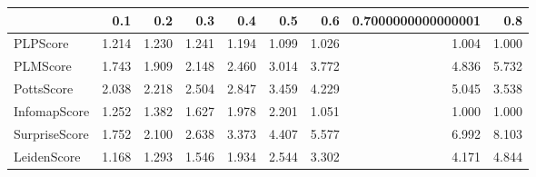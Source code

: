 \begin{tabular}{lrrrrrrrr}
\toprule
{} &   0.1 &   0.2 &   0.3 &   0.4 &   0.5 &   0.6 & 0.7000000000000001 &   0.8 \\
\midrule
PLPScore      & 1.214 & 1.230 & 1.241 & 1.194 & 1.099 & 1.026 &              1.004 & 1.000 \\
PLMScore      & 1.743 & 1.909 & 2.148 & 2.460 & 3.014 & 3.772 &              4.836 & 5.732 \\
PottsScore    & 2.038 & 2.218 & 2.504 & 2.847 & 3.459 & 4.229 &              5.045 & 3.538 \\
InfomapScore  & 1.252 & 1.382 & 1.627 & 1.978 & 2.201 & 1.051 &              1.000 & 1.000 \\
SurpriseScore & 1.752 & 2.100 & 2.638 & 3.373 & 4.407 & 5.577 &              6.992 & 8.103 \\
LeidenScore   & 1.168 & 1.293 & 1.546 & 1.934 & 2.544 & 3.302 &              4.171 & 4.844 \\
\bottomrule
\end{tabular}
